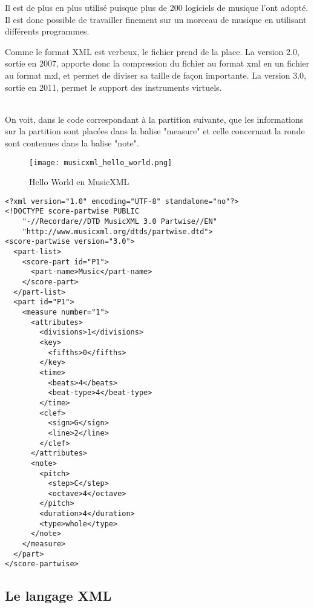 \par
Il est de plus en plus utilisé puisque plus de 200 logiciels de musique l’ont adopté. Il est donc possible de travailler finement sur un morceau de musique en utilisant différents programmes.

\par
Comme le format XML est verbeux, le fichier prend de la place. La version 2.0, sortie en 2007, apporte donc la compression du fichier au format xml en un fichier au format mxl, et permet de diviser sa taille de façon importante. La version 3.0, sortie en 2011, permet le support des instruments virtuels.\\~\\

\par
On voit, dans le code correspondant à la partition suivante, que les informations sur la partition sont placées dans la balise "measure" et celle concernant la ronde sont contenues dans la balise "note".

\begin{figure}[!h] %
\centering
\texttt{[image: musicxml\_hello\_world.png]}\\[1cm]
\caption{Hello World en MusicXML}
\label{Hello World en MusicXML}
\end{figure}


\begin{lstlisting}[caption=Document XML d'un Hello World en MusicXML, label=ruleml]
<?xml version="1.0" encoding="UTF-8" standalone="no"?>
<!DOCTYPE score-partwise PUBLIC
    "-//Recordare//DTD MusicXML 3.0 Partwise//EN"
    "http://www.musicxml.org/dtds/partwise.dtd">
<score-partwise version="3.0">
  <part-list>
    <score-part id="P1">
      <part-name>Music</part-name>
    </score-part>
  </part-list>
  <part id="P1">
    <measure number="1">
      <attributes>
        <divisions>1</divisions>
        <key>
          <fifths>0</fifths>
        </key>
        <time>
          <beats>4</beats>
          <beat-type>4</beat-type>
        </time>
        <clef>
          <sign>G</sign>
          <line>2</line>
        </clef>
      </attributes>
      <note>
        <pitch>
          <step>C</step>
          <octave>4</octave>
        </pitch>
        <duration>4</duration>
        <type>whole</type>
      </note>
    </measure>
  </part>
</score-partwise>
\end{lstlisting}



\subsection{Le langage XML}


